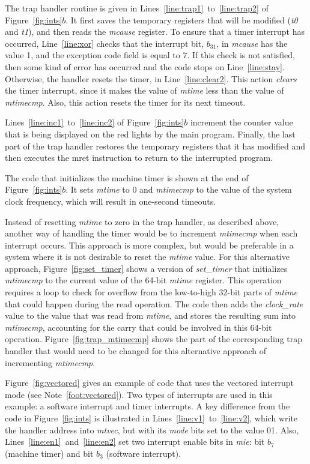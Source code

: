 \documentclass[11pt, twoside, pdftex]{article}
\begin{document}
The trap handler routine is given in Lines~\ref{line:trap1}~to~\ref{line:trap2} of
Figure~\ref{fig:ints}$b$.  It first saves the temporary registers that will be modified
({\it t0} and {\it t1}), and then reads the {\it mcause} register. To ensure that a timer
interrupt has occurred, Line~\ref{line:xor} checks that the interrupt bit, $b_{31}$, in
{\it mcause} has the value 1, and the exception code field is equal to 7. If this check is not
satisfied, then some kind of error has occurred and the code stops on
Line~\ref{line:stay}. Otherwise, the handler resets the timer, in
Line~\ref{line:clear2}. This action {\it clears} the timer 
interrupt, since it makes the value of {\it mtime} less than the value of 
{\it mtimecmp}. Also, this action resets the timer for its next timeout. 

Lines~\ref{line:inc1}~to~\ref{line:inc2} of Figure~\ref{fig:ints}$b$ increment the counter
value that is being displayed on the red lights by the main program. Finally, the last
part of the trap handler restores the temporary registers that it has modified and then 
executes the {\sf mret} instruction to return to the interrupted program.

The code that initializes the machine timer is shown at the end of
Figure~\ref{fig:ints}$b$. It sets {\it mtime} to 0 and {\it mtimecmp} to the value
of the system clock frequency, which will result in one-second timeouts.

Instead of resetting {\it mtime} to zero in the trap handler, as described above, another way
of handling the timer would be to increment {\it mtimecmp} when each interrupt occurs. 
This approach is more complex, but would be preferable in a system where it is not desirable 
to reset the {\it mtime} value. For this alternative approach, Figure~\ref{fig:set_timer} 
shows a version of {\it set\_timer} that initializes {\it mtimecmp} to the current value of 
the 64-bit {\it mtime} register. This operation requires a loop to check for overflow from 
the low-to-high 32-bit parts of {\it mtime} that could happen during the read operation. 
The code then adds the {\it clock\_rate} value to the value that was read from {\it
mtime}, and stores the resulting sum into
{\it mtimecmp}, accounting for the carry that could be involved in this 64-bit operation.
Figure~\ref{fig:trap_mtimecmp} shows the part of the corresponding 
trap handler that would need to be changed for this alternative approach of incrementing
{\it mtimecmp}. 

Figure~\ref{fig:vectored} gives an example of code that uses the vectored interrupt
mode (see Note~\ref{foot:vectored}). Two types of interrupts are used in this example:
a software interrupt and timer interrupts. A key difference from the
code in Figure~\ref{fig:ints} is illustrated in Lines~\ref{line:v1}~to~\ref{line:v2}, 
which write the handler address into {\it mtvec}, but with its {\it mode} bits set to the
value 01. Also, Lines~\ref{line:en1}~and~\ref{line:en2} set two interrupt enable bits in
{\it mie}: bit $b_7$ (machine timer) and bit $b_3$ (software interrupt). 
\end{document}
